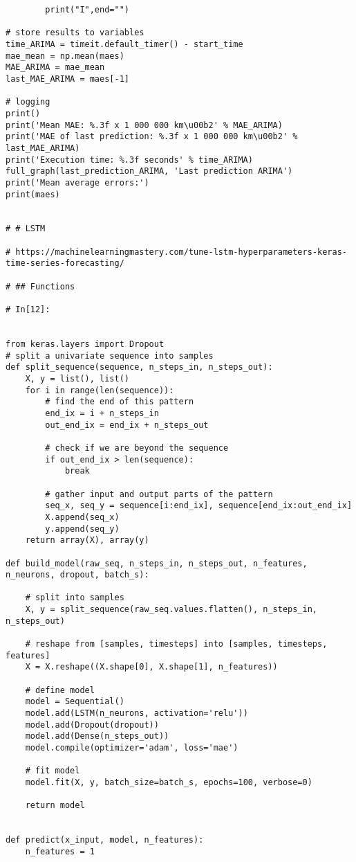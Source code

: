 \begin{verbatim}
        print("I",end="")

# store results to variables
time_ARIMA = timeit.default_timer() - start_time
mae_mean = np.mean(maes)
MAE_ARIMA = mae_mean
last_MAE_ARIMA = maes[-1]

# logging
print()
print('Mean MAE: %.3f x 1 000 000 km\u00b2' % MAE_ARIMA)
print('MAE of last prediction: %.3f x 1 000 000 km\u00b2' % last_MAE_ARIMA)
print('Execution time: %.3f seconds' % time_ARIMA)
full_graph(last_prediction_ARIMA, 'Last prediction ARIMA')
print('Mean average errors:')
print(maes)


# # LSTM

# https://machinelearningmastery.com/tune-lstm-hyperparameters-keras-time-series-forecasting/

# ## Functions 

# In[12]:


from keras.layers import Dropout
# split a univariate sequence into samples
def split_sequence(sequence, n_steps_in, n_steps_out):
    X, y = list(), list()
    for i in range(len(sequence)):
        # find the end of this pattern
        end_ix = i + n_steps_in
        out_end_ix = end_ix + n_steps_out
        
        # check if we are beyond the sequence
        if out_end_ix > len(sequence):
            break
            
        # gather input and output parts of the pattern
        seq_x, seq_y = sequence[i:end_ix], sequence[end_ix:out_end_ix]
        X.append(seq_x)
        y.append(seq_y)
    return array(X), array(y)
 
def build_model(raw_seq, n_steps_in, n_steps_out, n_features, n_neurons, dropout, batch_s):
    
    # split into samples
    X, y = split_sequence(raw_seq.values.flatten(), n_steps_in, n_steps_out)
    
    # reshape from [samples, timesteps] into [samples, timesteps, features]
    X = X.reshape((X.shape[0], X.shape[1], n_features))
    
    # define model
    model = Sequential()
    model.add(LSTM(n_neurons, activation='relu'))
    model.add(Dropout(dropout))
    model.add(Dense(n_steps_out))
    model.compile(optimizer='adam', loss='mae')
    
    # fit model
    model.fit(X, y, batch_size=batch_s, epochs=100, verbose=0)
    
    return model


def predict(x_input, model, n_features):
    n_features = 1
    

\end{verbatim}
